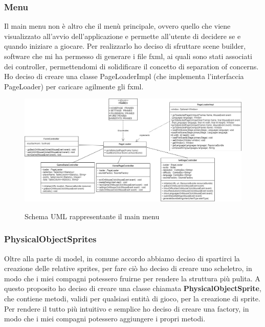 \subsubsection{Menu}
Il main menu non è altro che il menù principale, ovvero quello che viene visualizzato all'avvio dell'applicazione e permette all'utente di decidere se e quando iniziare a giocare.
Per realizzarlo ho deciso di sfruttare scene builder, software che mi ha permesso di generare i file fxml, ai quali sono stati associati dei controller, permettendomi di solidificare il concetto di separation of concerns. Ho deciso di creare una classe PageLoaderImpl (che implementa l'interfaccia PageLoader) per caricare agilmente gli fxml.

\begin{figure}[H]
	\centering{}
	\includegraphics[width=480pt]{img/main_menu}
	\label{img:main_menu.png}
	\caption{Schema UML rappresentante il main menu\\}
\end{figure}

\newpage

\subsubsection{PhysicalObjectSprites}

Oltre alla parte di model, in comune accordo abbiamo deciso di spartirci la creazione delle relative sprites, per fare ciò ho deciso di creare uno scheletro, in modo che i miei compagni potessero fruirne per rendere la struttura più pulita. A questo proposito ho deciso di creare una classe chiamata \textbf{PhysicalObjectSprite}, che contiene metodi, validi per qualsiasi entità di gioco, per la creazione di sprite. Per rendere il tutto più intuitivo e semplice ho deciso di creare una factory, in modo che i miei compagni potessero aggiungere i propri metodi.

